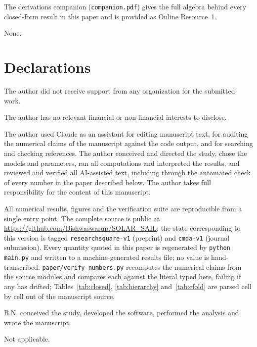 \documentclass[pdflatex,sn-mathphys-num]{sn-jnl}
\begin{document}
\backmatter

The derivations companion (\texttt{companion.pdf}) gives the full algebra behind
every closed-form result in this paper and is provided as Online Resource~1.

None.

\section*{Declarations}

The author did not receive support from any organization for the submitted work.

The author has no relevant financial or non-financial interests to disclose.

The author used Claude as an assistant for editing manuscript
text, for auditing the numerical claims of the manuscript against the code
output, and for searching and checking references. The author conceived and
directed the study, chose the models and parameters, ran all computations and
interpreted the results, and reviewed and verified all AI-assisted text,
including through the automated check of every number in the paper described
below. The author takes full responsibility for the content of this manuscript.

All numerical results, figures and the verification suite are reproducible from
a single entry point. The complete source is public at
\url{https://github.com/Bishwaswarup/SOLAR_SAIL}; the state corresponding to
this version is tagged \texttt{researchsquare-v1} (preprint) and
\texttt{cmda-v1} (journal submission).
Every quantity quoted in this paper is regenerated by \texttt{python main.py}
and written to a machine-generated results file; no value is hand-transcribed.
\texttt{paper/verify\_numbers.py} recomputes the numerical claims from the
source modules and compares each against the literal typed here, failing if any
has drifted; Tables~\ref{tab:closed}, \ref{tab:hierarchy} and~\ref{tab:efold}
are parsed cell by cell out of the manuscript source.

B.N. conceived the study, developed the software, performed the analysis and
wrote the manuscript.

Not applicable.


\end{document}
